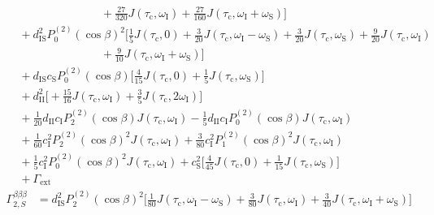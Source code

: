 \begin{appendixtext}
\begin{equation*}
\begin{split}
&\hspace{90pt} +\frac{27}{320}J\left(\tau_{\text{c}},\omega_{\text{I}}\right) +\frac{27}{160}J\left(\tau_{\text{c}},\omega_{\text{I}}+\omega_{\text{S}}\right)\bigg] \\
&\hspace{4pt}+d_{\text{IS}}^2P_0^{(2)}(\cos\beta)^2\bigg[\frac{1}{5}J(\tau_{\text{c}},0)+\frac{3}{20}J\left(\tau_{\text{c}},\omega_{\text{I}}-\omega_{\text{S}}\right)+\frac{3}{20}J\left(\tau_{\text{c}},\omega_{\text{S}}\right)+\frac{9}{20}J\left(\tau_{\text{c}},\omega_{\text{I}}\right) \\ 
&\hspace{90pt}+\frac{9}{10}J\left(\tau_{\text{c}},\omega_{\text{I}}+\omega_{\text{S}}\right)\bigg] \\
&\hspace{4pt}+d_{\text{IS}}c_{\text{S}}P_0^{(2)}(\cos\beta)\bigg[\frac{4}{15}J\left(\tau_{\text{c}},0\right)+\frac{1}{5}J\left(\tau_{\text{c}},\omega_{\text{S}}\right)\bigg] \\
&\hspace{4pt}+d_{\text{II}}^2\bigg[+\frac{15}{16}J\left(\tau_{\text{c}},\omega_{\text{I}}\right)+\frac{3}{5}J\left(\tau_{\text{c}},2\omega_{\text{I}}\right)\bigg] \\
&\hspace{4pt}+ \frac{1}{20} d_{\text{II}}c_{\text{I}}P_2^{(2)}(\cos\beta) J\left(\tau_{\text{c}},\omega_{\text{I}}\right)- \frac{1}{5} d_{\text{II}}c_{\text{I}}P_0^{(2)}(\cos\beta) J\left(\tau_{\text{c}},\omega_{\text{I}}\right) \\ 
&\hspace{4pt}+\frac{1}{60} c_{\text{I}}^2P_2^{(2)}(\cos\beta)^2 J\left(\tau_{\text{c}},\omega_{\text{I}}\right)+\frac{3}{80} c_{\text{I}}^2P_1^{(2)}(\cos\beta)^2 J\left(\tau_{\text{c}},\omega_{\text{I}}\right) \\
&\hspace{4pt}+\frac{1}{5} c_{\text{I}}^2P_0^{(2)}(\cos\beta)^2J\left(\tau_{\text{c}},\omega_{\text{I}}\right)+c_{\text{S}}^2\bigg[\frac{4}{45}J\left(\tau_{\text{c}},0\right)+\frac{1}{15}J(\tau_{\text{c}},\omega_{\text{S}})\bigg]\\
&\hspace{4pt} +\Gamma_{\text{ext}}
\end{split}
\end{equation*}
\begin{equation*}
\begin{split}
\Gamma_{2,S}^{\beta\beta\beta}&=d_{\text{IS}}^2P_2^{(2)}(\cos\beta)^2\bigg[\frac{1}{80}J\left(\tau_{\text{c}},\omega_{\text{I}}-\omega_{\text{S}}\right)+\frac{3}{80}J\left(\tau_{\text{c}},\omega_{\text{I}}\right) +\frac{3}{40}J\left(\tau_{\text{c}},\omega_{\text{I}}+\omega_{\text{S}}\right)\bigg] \\

\end{split}
\end{equation*}
\end{appendixtext}
